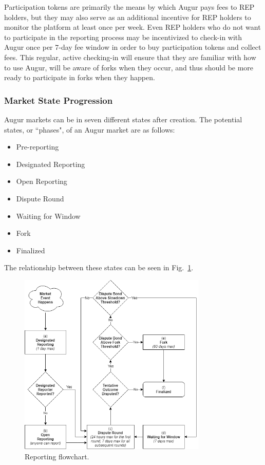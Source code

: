 \documentclass[floatfix,reprint,nofootinbib,amsmath,amssymb,epsfig,pre,floats,letterpaper,groupedaffiliation]{revtex4-1}
\theoremstyle{definition}
\theoremstyle{definition}
\begin{document}
Participation tokens are primarily the means by which Augur pays fees to REP holders, but they may also serve as an additional incentive for REP holders to monitor the platform at least once per week. Even REP holders who do not want to participate in the reporting process may be incentivized to check-in with Augur once per 7-day fee window in order to buy participation tokens and collect fees. This regular, active checking-in will ensure that they are familiar with how to use Augur, will be aware of forks when they occur, and thus should be more ready to participate in forks when they happen.

\subsubsection{Market State Progression}

Augur markets can be in seven different states after creation.  The potential states, or ``phases", of an Augur market are as follows:
\begin{itemize}
\item Pre-reporting
\item Designated Reporting
\item Open Reporting
\item Dispute Round
\item Waiting for Window
\item Fork
\item Finalized
\end{itemize}

The relationship between these states can be seen in Fig.~\ref{fig:reporting}.

\begin{figure}
\includegraphics[width=0.8\textwidth]{new_reporting.png}
\caption{Reporting flowchart.}
\label{fig:reporting}
\end{figure}
\end{document}
